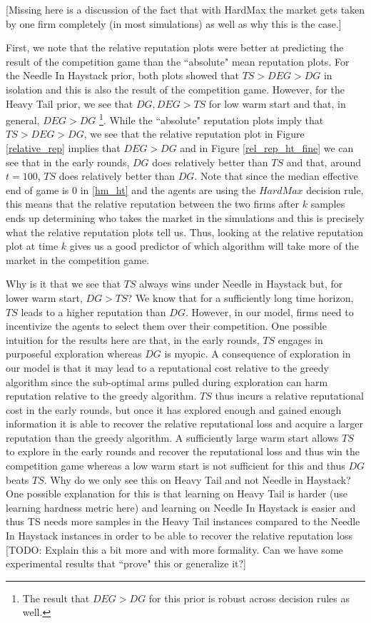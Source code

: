 \documentclass{article}
\theoremstyle{definition}
\begin{document}
[Missing here is a discussion of the fact that with HardMax the market gets taken by one firm completely (in most simulations) as well as why this is the case.]

First, we note that the relative reputation plots were better at predicting the result of the competition game than the ``absolute" mean reputation plots. For the Needle In Haystack prior, both plots showed that $TS > DEG > DG$ in isolation and this is also the result of the competition game. However, for the Heavy Tail prior, we see that $DG, DEG > TS$ for low warm start and that, in general, $DEG > DG$ \footnote{The result that $DEG > DG$ for this prior is robust across decision rules as well.}. While the ``absolute" reputation plots imply that $TS > DEG > DG$, we see that the relative reputation plot in Figure \ref{relative_rep} implies that $DEG > DG$ and in Figure \ref{rel_rep_ht_fine} we can see that in the early rounds, $DG$ does relatively better than $TS$ and that, around $t = 100$, $TS$ does relatively better than $DG$. Note that since the median effective end of game is $0$ in \ref{hm_ht} and the agents are using the $HardMax$ decision rule, this means that the relative reputation between the two firms after $k$ samples ends up determining who takes the market in the simulations and this is precisely what the relative reputation plots tell us. Thus, looking at the relative reputation plot at time $k$ gives us a good predictor of which algorithm will take more of the market in the competition game.

Why is it that we see that $TS$ always wins under Needle in Haystack but, for lower warm start, $DG > TS$? We know that for a sufficiently long time horizon, $TS$ leads to a higher reputation than $DG$. However, in our model, firms need to incentivize the agents to select them over their competition. One possible intuition for the results here are that, in the early rounds, $TS$ engages in purposeful exploration whereas $DG$ is myopic. A consequence of exploration in our model is that it may lead to a reputational cost relative to the greedy algorithm since the sub-optimal arms pulled during exploration can harm reputation relative to the greedy algorithm. $TS$ thus incurs a relative reputational cost in the early rounds, but once it has explored enough and gained enough information it is able to recover the relative reputational loss and acquire a larger reputation than the greedy algorithm. A sufficiently large warm start allows $TS$ to explore in the early rounds and recover the reputational loss and thus win the competition game whereas a low warm start is not sufficient for this and thus $DG$ beats $TS$. Why do we only see this on Heavy Tail and not Needle in Haystack? One possible explanation for this is that learning on Heavy Tail is harder (use learning hardness metric here) and learning on Needle In Haystack is easier and thus TS needs more samples in the Heavy Tail instances compared to the Needle In Haystack instances in order to be able to recover the relative reputation loss [TODO: Explain this a bit more and with more formality. Can we have some experimental results that ``prove" this or generalize it?]
\end{document}
